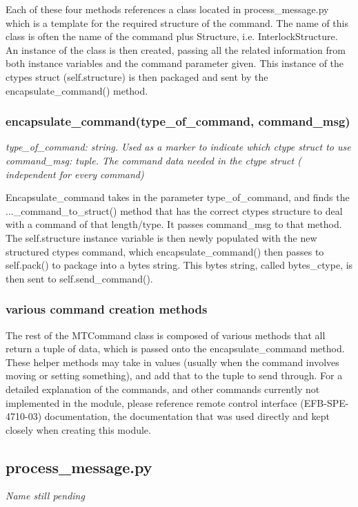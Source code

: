 \documentclass{article}
\begin{document}
Each of these four methods references a class located in process\_message.py which is a template for the required structure of the command. The name of this class is often the name of the command plus Structure, i.e. InterlockStructure. An instance of the class is then created, passing all the related information from both instance variables and the command parameter given. This instance of the ctypes struct (self.structure) is then packaged and sent by the encapsulate\_command() method.


\subsubsection{encapsulate\_command(type\_of\_command, command\_msg)}
\emph{type\_of\_command: string. Used as a marker to indicate which ctype struct to use}\\
\emph{command\_msg: tuple. The command data needed in the ctype struct ( independent for every command)}
\vspace{10pt}

Encapsulate\_command takes in the parameter type\_of\_command, and finds the ...\_command\_to\_struct() method that has the correct ctypes structure to deal with a command of that length/type. It passes command\_msg to that method. The self.structure instance variable is then newly populated with the new structured ctypes command, which encapsulate\_command() then passes to self.pack() to package into a bytes string. This bytes string, called bytes\_ctype, is then sent to self.send\_command(). 


\subsubsection{various command creation methods}

The rest of the MTCommand class is composed of various methods that all return a tuple of data, which is passed onto the encapsulate\_command method. These helper methods may take in values (usually when the command involves moving or setting something), and add that to the tuple to send through. For a detailed explanation of the commands, and other commands currently not implemented in the module, please reference remote control interface (EFB-SPE-4710-03)  documentation, the documentation that was used directly and kept closely when creating this module. 
 


\subsection{process\_message.py}
\emph{Name still pending}
\vspace{10pt}
\end{document}
